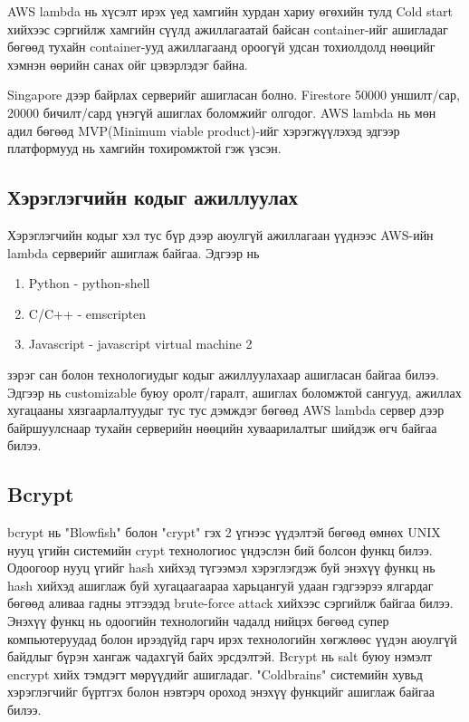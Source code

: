 AWS lambda нь хүсэлт ирэх үед хамгийн хурдан хариу өгөхийн тулд Cold start\footnotemark{}  хийхээс сэргийлж хамгийн сүүлд ажиллагаатай байсан container-ийг ашигладаг бөгөөд тухайн container-ууд ажиллагаанд ороогүй удсан тохиолдолд нөөцийг хэмнэн өөрийн санах ойг цэвэрлэдэг байна. 

Singapore дээр байрлах серверийг ашигласан болно. Firestore 50000 уншилт/сар, 20000 бичилт/сард үнэгүй ашиглах боломжийг олгодог. AWS lambda нь мөн адил бөгөөд MVP(Minimum viable product)-ийг хэрэгжүүлэхэд эдгээр платформууд нь хамгийн тохиромжтой гэж үзсэн.

\subsection{Хэрэглэгчийн кодыг ажиллуулах}
Хэрэглэгчийн кодыг хэл тус бүр дээр аюулгүй ажиллагаан үүднээс AWS-ийн lambda серверийг ашиглаж байгаа. Эдгээр нь
\begin{enumerate}
  \item Python - python-shell
  \item C/C++ - emscripten
  \item Javascript - javascript virtual machine 2
\end{enumerate}
зэрэг сан болон технологиудыг кодыг ажиллуулахаар ашигласан байгаа билээ. Эдгээр нь customizable буюу оролт/гаралт, ашиглах боломжтой сангууд, ажиллах хугацааны хязгаарлалтуудыг тус тус дэмждэг бөгөөд AWS lambda сервер дээр байршуулснаар тухайн серверийн нөөцийн хуваарилалтыг шийдэж өгч байгаа билээ. 

\subsection{Bcrypt}
bcrypt нь "Blowfish" болон "crypt" гэх 2 үгнээс үүдэлтэй бөгөөд өмнөх UNIX нууц үгийн системийн crypt технологиос үндэслэн бий болсон функц билээ\cite{bcrypt}. Одоогоор нууц үгийг hash хийхэд түгээмэл хэрэглэгдэж буй энэхүү функц нь hash хийхэд ашиглаж буй хугацаагаараа харьцангуй удаан гэдгээрээ ялгардаг бөгөөд аливаа гадны этгээдэд brute-force attack хийхээс сэргийлж байгаа билээ. Энэхүү функц нь одоогийн технологийн чадалд нийцэх бөгөөд супер компьютеруудад болон ирээдүйд гарч ирэх технологийн хөгжлөөс үүдэн аюулгүй байдлыг бүрэн хангаж чадахгүй байх эрсдэлтэй. Bcrypt нь salt буюу нэмэлт encrypt хийх тэмдэгт мөрүүдийг ашигладаг. "Coldbrains" системийн хувьд хэрэглэгчийг бүртгэх болон нэвтэрч ороход энэхүү функцийг ашиглаж байгаа билээ.

